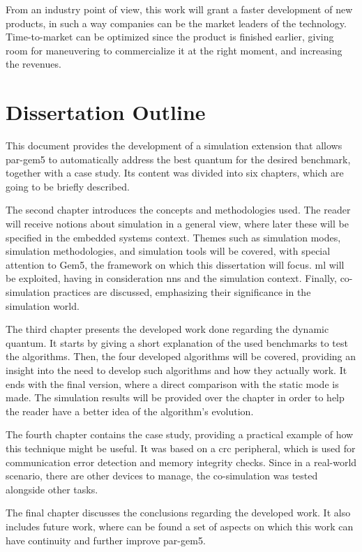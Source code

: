  From an industry point of view, this work will grant a faster development of new products, in such a way companies can be the market leaders 
 of the technology. Time-to-market can be optimized since the product is finished earlier, giving room for maneuvering to commercialize it at the 
 right moment, and increasing the revenues.
 
\section{Dissertation Outline}

This document provides the development of a simulation extension that allows par-gem5 to automatically address the best quantum for the desired 
benchmark, together with a case study. Its content was divided into six chapters, which are going to be briefly described.

The second chapter introduces the concepts and methodologies used. The reader will receive notions about simulation in a general view, where 
later these will be specified in the embedded systems context. Themes such as simulation modes, simulation methodologies, and simulation tools 
will be covered, with special attention to Gem5, the framework on which this dissertation will focus. \gls{ml} will be exploited, having in 
consideration \glspl{nn} and the simulation context. Finally, co-simulation practices are discussed, emphasizing their significance in the 
simulation world.

The third chapter presents the developed work done regarding the dynamic quantum. It starts by giving a short explanation of the used benchmarks
to test the algorithms. Then, the four developed algorithms will be covered, providing an insight into the need to develop 
such algorithms and how they actually work. It ends with the final version, where a direct comparison with the static mode is made. The 
simulation results will be provided over the chapter in order to help the reader have a better idea of the algorithm's evolution.

The fourth chapter contains the case study, providing a practical example of how this technique might be useful. It was based on a \gls{crc} 
peripheral, which is used for communication error detection and memory integrity checks. Since in a real-world scenario, there are other 
devices to manage, the co-simulation was tested alongside other tasks.

The final chapter discusses the conclusions regarding the developed work. It also includes future work, where can be found a set of 
aspects on which this work can have continuity and further improve par-gem5. 

